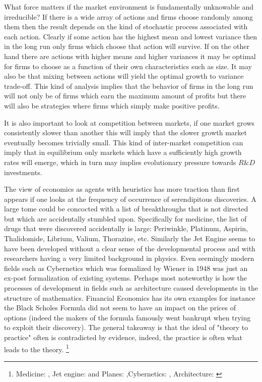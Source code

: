 \documentclass[12pt]{article}
\numberwithin{equation}{section}
\begin{document}
What force matters if the market environment is fundamentally unknowable and irreducible? If there is a wide array of actions and firms choose randomly among them then the result depends on the kind of stochastic process associated with each action. Clearly if some action has the highest mean and lowest variance then in the long run only firms which choose that action will survive\cite{alchian1950uncertainty}. If on the other hand there are actions with higher means and higher variances it may be optimal for firms to choose as a function of their own characteristics such as size. It may also be that mixing between actions will yield the optimal growth to variance trade-off. This kind of analysis implies that the behavior of firms in the long run will not only be of firms which earn the maximum amount of profits but there will also be strategies where firms which simply make positive profits. 

It is also important to look at competition between markets, if one market grows consistently slower than another this will imply that the slower growth market eventually becomes trivially small. This kind of inter-market competition can imply that in equilibrium only markets which have a sufficiently high growth rates will emerge, which in turn may implies evolutionary pressure towards $R\&D$ investments. 

The view of economics as agents with heuristics has more traction than first appears if one looks at the frequency of occurrence of serendipitous discoveries. A large tome could be concocted with a list of breakthroughs that is not directed but which are accidentally stumbled upon. Specifically for medicine, the list of drugs that were discovered accidentally is large: Periwinkle, Platinum, Aspirin, Thalidomide, Librium, Valium, Thorazine, etc. Similarly the Jet Engine seems to have been developed without a clear sense of the developmental process and with researchers having a very limited background in physics. Even seemingly modern fields such as Cybernetics which was formalized by Wiener in 1948 was just an ex-post formalization of existing systems. Perhaps most noteworthy is how the processes of development in fields such as architecture caused developments in the structure of mathematics. Financial Economics has its own examples for instance the Black Scholes Formula did not seem to have an impact on the prices of options (indeed the makers of the formula famously went bankrupt when trying to exploit their discovery). The general takeaway is that the ideal of "theory to practice" often is contradicted by evidence, indeed, the practice is often what leads to the theory. \footnote{ Medicine: \cite{meyers2007happy}, Jet engine: \cite{scranton2006urgency} and Planes: \cite{meyer2013airplane},Cybernetics: \cite{mindell2002between}, Architecture: \cite{unguru1992guy}}
\end{document}
